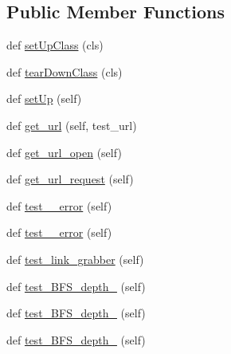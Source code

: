 \subsection*{Public Member Functions}
\begin{DoxyCompactItemize}
\item 
def \hyperlink{classpylinkvalidator_1_1_web_handy_tool_1_1tests_1_1crawler_test_a488a0ba0983f998e70b16f99d1206a4e}{set\+Up\+Class} (cls)
\item 
def \hyperlink{classpylinkvalidator_1_1_web_handy_tool_1_1tests_1_1crawler_test_af6eb886ff5b26bd69f9f309ce3d84981}{tear\+Down\+Class} (cls)
\item 
def \hyperlink{classpylinkvalidator_1_1_web_handy_tool_1_1tests_1_1crawler_test_a59924a9695a61c66650b7c4c3a5697cc}{set\+Up} (self)
\item 
def \hyperlink{classpylinkvalidator_1_1_web_handy_tool_1_1tests_1_1crawler_test_a9bfdb2427ff25ed415115347baa183e3}{get\+\_\+url} (self, test\+\_\+url)
\item 
def \hyperlink{classpylinkvalidator_1_1_web_handy_tool_1_1tests_1_1crawler_test_a3db5e9ca3315af5e2b8f29c098667a9d}{get\+\_\+url\+\_\+open} (self)
\item 
def \hyperlink{classpylinkvalidator_1_1_web_handy_tool_1_1tests_1_1crawler_test_a16539cd0e3add6d4ec5557194a96c0bc}{get\+\_\+url\+\_\+request} (self)
\item 
def \hyperlink{classpylinkvalidator_1_1_web_handy_tool_1_1tests_1_1crawler_test_a404f44c124831e5c9593b2b3ebc6be88}{test\+\_\+\_\+error} (self)
\item 
def \hyperlink{classpylinkvalidator_1_1_web_handy_tool_1_1tests_1_1crawler_test_adb2a22bd6d79bc38b353d966d9a2b45f}{test\+\_\+\_\+error} (self)
\item 
def \hyperlink{classpylinkvalidator_1_1_web_handy_tool_1_1tests_1_1crawler_test_ac00856c89d2d4130ffe0ca385df3f679}{test\+\_\+link\+\_\+grabber} (self)
\item 
def \hyperlink{classpylinkvalidator_1_1_web_handy_tool_1_1tests_1_1crawler_test_a48e6e241f7fa3ceaa7c49675292c8218}{test\+\_\+\+B\+F\+S\+\_\+depth\+\_} (self)
\item 
def \hyperlink{classpylinkvalidator_1_1_web_handy_tool_1_1tests_1_1crawler_test_acde5a29e709f738a357da43e8ce8e06b}{test\+\_\+\+B\+F\+S\+\_\+depth\+\_} (self)
\item 
def \hyperlink{classpylinkvalidator_1_1_web_handy_tool_1_1tests_1_1crawler_test_abb5fe183951e209f66c2b4e292c99eb7}{test\+\_\+\+B\+F\+S\+\_\+depth\+\_} (self)

\end{DoxyCompactItemize}
